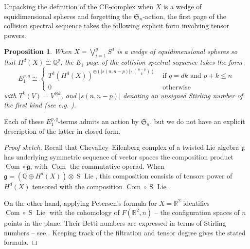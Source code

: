 \documentclass[12pt]{article}
\newcommand{\Q}{\mathbb{Q}}
\newcommand{\R}{\mathbb{R}}
\newcommand{\SymGroup}[1][n]{\mathfrak{S}_{#1}}
\DeclareMathOperator{\FB}{FB}
\DeclareMathOperator{\Lie}{Lie}
\DeclareMathOperator{\Suspension}{S}
\theoremstyle{plain}
\newtheorem{prop}[thm]{Proposition}
\theoremstyle{definition}
\theoremstyle{remark}
\begin{document}
Unpacking the definition of the CE-complex when $X$ is a wedge of equidimensional spheres and forgetting the $\SymGroup$-action, the first page of the collision spectral sequence takes the following explicit form involving tensor powers.

\begin{prop}\label{prop:spectral_sequence_unidim}
When $X = \bigvee_{i=1}^g S^d$ is a wedge of equidimensional spheres so that $H^d(X) \cong \Q^g$, the $E_1$-page of the collision spectral sequence takes the form
\begin{equation}\label{eq:E1 term unidim}
    E_1^{p, q} \cong \begin{cases}
    T^k(H^d(X))^{\oplus \left(|s(n, n-p)|\cdot \binom{n-p}{k}\right)} & \text{ if $q=dk$ and $p+k \leq n$} \\
    0 & \text{ otherwise}
    \end{cases}
\end{equation}
with $T^k(V) = V^{\otimes k}$, and $|s(n, n-p)|$ denoting an unsigned Stirling number of the first kind (see e.g. \cite[\S 1.3]{Stanley11}).
\end{prop}

Each of these $E_1^{p,q}$-terms admits an action by $\SymGroup$, but we do not have an explicit description of the latter in closed form.
    \begin{proof}[Proof sketch]
        Recall that Chevalley--Eilenberg complex of a twisted Lie algebra $\mathfrak{g}$ has underlying symmetric sequence of vector spaces the composition product $\operatorname{Com}\circ \mathfrak{g}$, with $\operatorname{Com}$ the commutative operad. When $\mathfrak{g} = (\Q \oplus H^d(X)) \otimes \Suspension\Lie$, this composition consists of tensors power of $H^d(X)$ tensored with the composition $\operatorname{Com}\circ \Suspension\Lie$.
        
        On the other hand, applying Petersen's formula for $X=\mathbb{R}^2$ identifies $\operatorname{Com}\circ \Suspension\Lie$ with the cohomology of $F(\mathbb{R}^2, n)$ -- the configuration spaces of $n$ points in the plane. Their Betti numbers are expressed in terms of Stirling numbers -- see \cite{Get-resolving-Hodge}. Keeping track of the filtration and tensor degree gives the stated formula.
    \end{proof}
    
\end{document}
